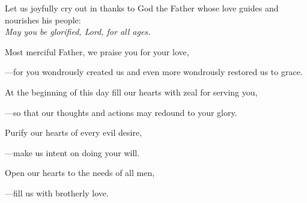 \intercessions\indent

\begin{hangpar}

Let us joyfully cry out in thanks to God the Father whose love guides and nourishes his people:\\
\emph{May you be glorified, Lord, for all ages.}

\medskip Most merciful Father, we praise you for your love,

{\color{red}---\thinspace}for you wondrously created us and even more wondrously restored us to grace.

\medskip At the beginning of this day fill our hearts with zeal for serving you,

{\color{red}---\thinspace}so that our thoughts and actions may redound to your glory.

\medskip Purify our hearts of every evil desire,

{\color{red}---\thinspace}make us intent on doing your will.

\medskip Open our hearts to the needs of all men,

{\color{red}---\thinspace}fill us with brotherly love.

\end{hangpar}

